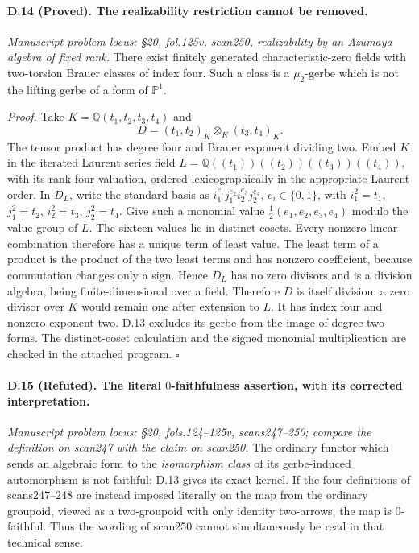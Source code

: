 \paragraph{D.14 (Proved). The realizability restriction cannot be removed.}
\emph{Manuscript problem locus: \S20, fol.125v, scan250, realizability by an Azumaya algebra of fixed rank.}
There exist finitely generated characteristic-zero fields with two-torsion Brauer classes of index four. Such a class is a $\mu_2$-gerbe which is not the lifting gerbe of a form of $\mathbb P^1$.

\emph{Proof.} Take $K=\mathbb Q(t_1,t_2,t_3,t_4)$ and
\[
D=(t_1,t_2)_K\otimes_K(t_3,t_4)_K.
\]
The tensor product has degree four and Brauer exponent dividing two. Embed $K$ in the iterated Laurent series field $L=\mathbb Q((t_1))((t_2))((t_3))((t_4))$, with its rank-four valuation, ordered lexicographically in the appropriate Laurent order. In $D_L$, write the standard basis as $i_1^{e_1}j_1^{e_2}i_2^{e_3}j_2^{e_4}$, $e_i\in\{0,1\}$, with $i_1^2=t_1$, $j_1^2=t_2$, $i_2^2=t_3$, $j_2^2=t_4$. Give such a monomial value $\frac12(e_1,e_2,e_3,e_4)$ modulo the value group of $L$. The sixteen values lie in distinct cosets. Every nonzero linear combination therefore has a unique term of least value. The least term of a product is the product of the two least terms and has nonzero coefficient, because commutation changes only a sign. Hence $D_L$ has no zero divisors and is a division algebra, being finite-dimensional over a field. Therefore $D$ is itself division: a zero divisor over $K$ would remain one after extension to $L$. It has index four and nonzero exponent two. D.13 excludes its gerbe from the image of degree-two forms. The distinct-coset calculation and the signed monomial multiplication are checked in the attached program. \hfill$\square$

\paragraph{D.15 (Refuted). The literal $0$-faithfulness assertion, with its corrected interpretation.}
\emph{Manuscript problem locus: \S20, fols.124--125v, scans247--250; compare the definition on scan247 with the claim on scan250.}
The ordinary functor which sends an algebraic form to the \emph{isomorphism class} of its gerbe-induced automorphism is not faithful: D.13 gives its exact kernel. If the four definitions of scans247--248 are instead imposed literally on the map from the ordinary groupoid, viewed as a two-groupoid with only identity two-arrows, the map is $0$-faithful. Thus the wording of scan250 cannot simultaneously be read in that technical sense.

